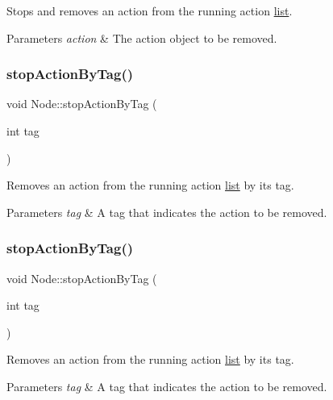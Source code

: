 Stops and removes an action from the running action \hyperlink{protocollist-p}{list}.


\begin{DoxyParams}{Parameters}
{\em action} & The action object to be removed. \\
\hline
\end{DoxyParams}
\mbox{\label{classNode_a58833aec8d21bf1ed647865c220c7c49}} 
\subsubsection{\texorpdfstring{stop\+Action\+By\+Tag()}{stopActionByTag()}\hspace{0.1cm}{\footnotesize\ttfamily [1/2]}}
{\footnotesize\ttfamily void Node\+::stop\+Action\+By\+Tag (\begin{DoxyParamCaption}\item[{int}]{tag }\end{DoxyParamCaption})}

Removes an action from the running action \hyperlink{protocollist-p}{list} by its tag.


\begin{DoxyParams}{Parameters}
{\em tag} & A tag that indicates the action to be removed. \\
\hline
\end{DoxyParams}
\mbox{\label{classNode_a58833aec8d21bf1ed647865c220c7c49}} 
\subsubsection{\texorpdfstring{stop\+Action\+By\+Tag()}{stopActionByTag()}\hspace{0.1cm}{\footnotesize\ttfamily [2/2]}}
{\footnotesize\ttfamily void Node\+::stop\+Action\+By\+Tag (\begin{DoxyParamCaption}\item[{int}]{tag }\end{DoxyParamCaption})}

Removes an action from the running action \hyperlink{protocollist-p}{list} by its tag.


\begin{DoxyParams}{Parameters}
{\em tag} & A tag that indicates the action to be removed. \\
\hline
\end{DoxyParams}
\mbox{\label{classNode_a36eef67f2b7d8026328d452e9a5ab09c}} 
